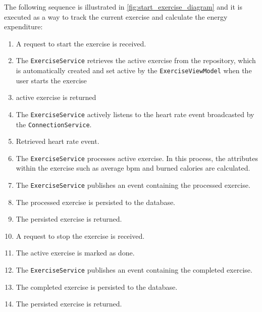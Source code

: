 The following sequence is illustrated in \autoref{fig:start_exercise_diagram} and it is executed as a way to track the current exercise and calculate the energy expenditure:
\begin{enumerate}
    \item A request to start the exercise is received.
    \item The \texttt{ExerciseService} retrieves the active exercise from the repository, which is automatically created and set active by the \texttt{ExerciseViewModel} when the user starts the exercise
    \item active exercise is returned
    \item The \texttt{ExerciseService} actively listens to the heart rate event broadcasted by the \texttt{ConnectionService}.
    \item Retrieved heart rate event.
    \item The \texttt{ExerciseService} processes active exercise. In this process, the attributes within the exercise such as average bpm and burned calories are calculated.
    \item The \texttt{ExerciseService} publishes an event containing the processed exercise.
    \item The processed exercise is persisted to the database.
    \item The persisted exercise is returned.
    \item A request to stop the exercise is received.
    \item The active exercise is marked as done.
    \item The \texttt{ExerciseService} publishes an event containing the completed exercise.
    \item The completed exercise is persisted to the database.
    \item The persisted exercise is returned.
\end{enumerate}

